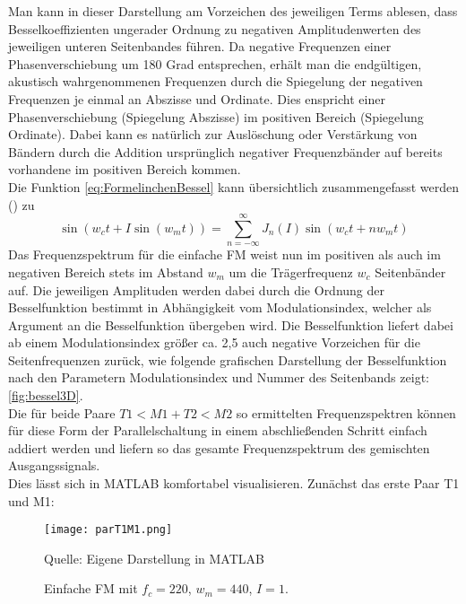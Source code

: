 Man kann in dieser Darstellung am Vorzeichen des jeweiligen Terms ablesen, dass Besselkoeffizienten ungerader Ordnung zu negativen Amplitudenwerten des jeweiligen unteren Seitenbandes führen. Da negative Frequenzen einer Phasenverschiebung um 180 Grad entsprechen, erhält man die endgültigen, akustisch wahrgenommenen Frequenzen durch die Spiegelung der negativen Frequenzen je einmal an Abszisse und Ordinate. Dies enspricht einer Phasenverschiebung (Spiegelung Abszisse) im positiven Bereich (Spiegelung Ordinate). Dabei kann es natürlich zur Auslöschung oder Verstärkung von Bändern durch die Addition ursprünglich negativer Frequenzbänder auf bereits vorhandene im positiven Bereich kommen. \\
Die Funktion \ref{eq:FormelinchenBessel} kann übersichtlich zusammengefasst werden (\cite{schottstaedtWeb}) zu 
\begin{equation}\label{esq:Besselbabymonster}
\sin(w_ct + I\sin(w_mt)) = \sum_{n=-\infty}^{\infty}J_n(I)\sin(w_ct+nw_mt)
\end{equation}
Das Frequenzspektrum für die einfache FM weist nun im positiven als auch im negativen Bereich stets im Abstand \begin{math} w_m \end{math} um die Trägerfrequenz \begin{math} w_c \end{math} Seitenbänder auf. Die jeweiligen Amplituden werden dabei durch die Ordnung der Besselfunktion bestimmt in Abhängigkeit vom Modulationsindex, welcher als Argument an die Besselfunktion übergeben wird. Die Besselfunktion liefert dabei ab einem Modulationsindex größer ca. 2,5 auch negative Vorzeichen für die Seitenfrequenzen zurück, wie folgende grafischen Darstellung der Besselfunktion nach den Parametern Modulationsindex und Nummer des Seitenbands zeigt: \ref{fig:bessel3D}. \\
Die für beide Paare $T1<M1 + T2<M2$ so ermittelten Frequenzspektren können für diese Form der Parallelschaltung in einem abschließenden Schritt einfach addiert werden und liefern so das gesamte Frequenzspektrum des gemischten Ausgangssignals. \\
Dies lässt sich in MATLAB komfortabel visualisieren. Zunächst das erste Paar T1 und M1:
\FloatBarrier
\begin{figure} [ht]
\centering
  \texttt{[image: parT1M1.png]}
\caption{Einfache FM mit $f_c = 220$, $w_m = 440$, $I = 1$. }
Quelle: Eigene Darstellung in MATLAB
\end{figure}
